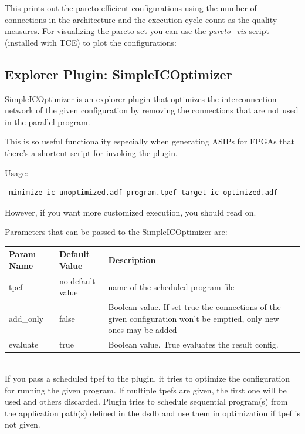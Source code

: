 \documentclass[twoside]{tceusermanual}
\begin{document}

This prints out the pareto efficient configurations using the
number of connections in the architecture and the execution cycle count as
the quality measures. For visualizing the pareto set you can use the
\textit{pareto\_vis} script (installed with TCE) to plot the configurations:


\subsection{Explorer Plugin: SimpleICOptimizer}

SimpleICOptimizer is an explorer plugin that optimizes the interconnection
network of the given configuration by removing the connections that are not
used in the parallel program. 

This is so useful functionality especially when generating ASIPs for
FPGAs that there's a shortcut script for invoking the plugin.

Usage: 
\begin{verbatim}
 minimize-ic unoptimized.adf program.tpef target-ic-optimized.adf
\end{verbatim}

However, if you want more customized execution, you should read on.

Parameters that can be passed to the
SimpleICOptimizer are:

\begin{tabular}{p{}p{}
                p{}}
\textbf{Param Name} &\textbf{Default Value} &\textbf{Description} \\
\hline
tpef & no default value &  name of the scheduled program file \\
add\_only & false &  Boolean value. If set true the connections of the given 
configuration won't be emptied, only new ones may be added\\
evaluate & true &  Boolean value. True evaluates the result config. \\
\end{tabular}\\

If you pass a scheduled tpef to the plugin, it tries to optimize the configuration
for running the given program. If multiple tpefs are given, the first one will be used
and others discarded.
Plugin tries to schedule sequential program(s) from the application path(s) defined in
the dsdb and use them in optimization if tpef is not given.
\end{document}
